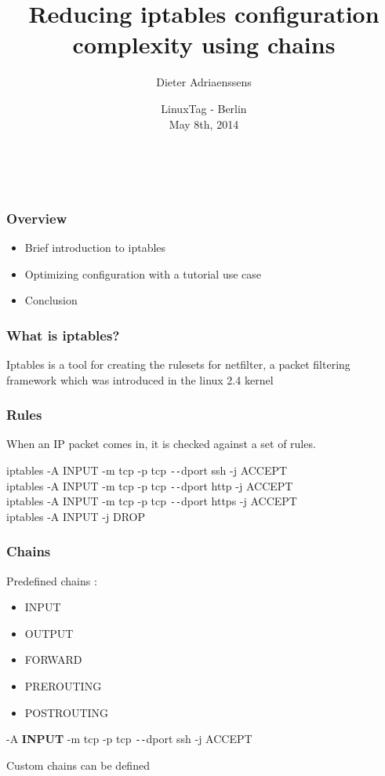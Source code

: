 \documentclass[14pt]{beamer}
\title[Reduce iptables config complexity]{Reducing iptables configuration complexity using chains}
\author{Dieter Adriaenssens}
\institute[UGent]{@dcadriaenssens - Ghent University, Belgium}
\date[LinuxTag 8May2014]{LinuxTag - Berlin\\
May 8th, 2014}
\newcommand{\dd}{{\texttt{-{}-}}}
\begin{document}
  \begin{frame}
  \titlepage
  \vfill
    \begin{center}
      \\[2.5ex]
        {\tiny\CcNote{\CcLongnameBySa}}
        \vspace*{-2.5ex}
    \end{center}
  \end{frame}
  \begin{frame}
    \frametitle{Overview}
    \begin{itemize}
      \item Brief introduction to iptables
      \item Optimizing configuration with a tutorial use case
      \item Conclusion
    \end{itemize}
  \end{frame}
  \begin{frame}
    \frametitle{What is iptables?}
    Iptables is a tool for creating the rulesets for netfilter, a packet filtering framework which was introduced in the linux 2.4 kernel
  \end{frame}
  \begin{frame}
    \frametitle{Rules}
    When an IP packet comes in, it is checked against a set of rules.
    \begin{example}
      \small{iptables -A INPUT -m tcp -p tcp \dd dport ssh -j ACCEPT\\
      iptables -A INPUT -m tcp -p tcp \dd dport http -j ACCEPT\\
      iptables -A INPUT -m tcp -p tcp \dd dport https -j ACCEPT\\
      iptables -A INPUT -j DROP}
    \end{example}
  \end{frame}
  \begin{frame}
    \frametitle{Chains}
    Predefined chains :
    \begin{itemize}
      \item INPUT
      \item OUTPUT
      \item FORWARD
      \item PREROUTING
      \item POSTROUTING
    \end{itemize}
    \begin{example}
      \small{-A \textbf{INPUT} -m tcp -p tcp \dd dport ssh -j ACCEPT}
    \end{example}
    Custom chains can be defined
  \end{frame}
\end{document}
